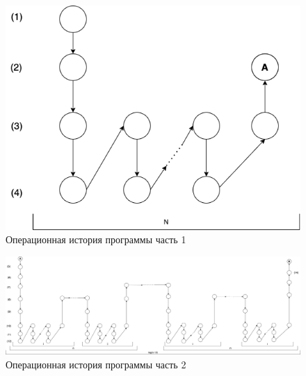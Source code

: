 \begin{figure}[h!]
	\begin{center}
		\includegraphics[scale=0.6]{assets/2.png}
	\end{center}
	\caption{Операционная история программы часть 1}
\end{figure}

\begin{figure}[h!]
	\begin{center}
		\includegraphics[scale=0.24]{assets/2_2.png}
	\end{center}
	\caption{Операционная история программы часть 2}
\end{figure}


